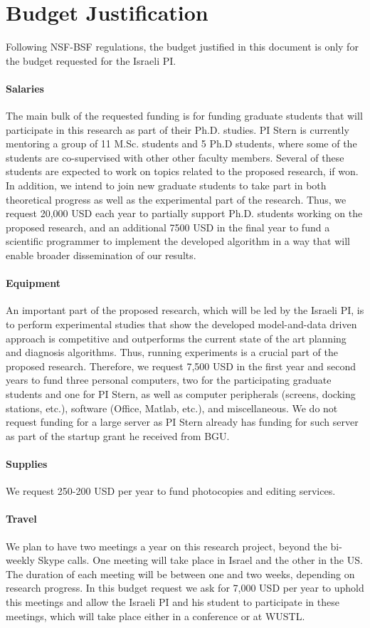 \documentclass[12pt]{article}
\begin{document}
\section*{Budget Justification}
Following NSF-BSF regulations, the budget justified in this document is only for the budget requested for the Israeli PI. 

\paragraph{Salaries}
The main bulk of the requested funding is for funding graduate students that will participate in this research as part of their Ph.D. studies. PI Stern is currently mentoring a group of 11 M.Sc. students and 5 Ph.D students, where some of the students are co-supervised with other other faculty members. Several of these students are expected to work on topics related to the proposed research, if won. In addition, we intend to join new graduate students to take part in both theoretical progress as well as the experimental part of the research. 
Thus, we request 20,000 USD each year to partially support Ph.D. students working on the proposed research, and an additional 7500 USD in the final year to fund a scientific programmer to implement the developed algorithm in a way that will enable broader dissemination of our results. 

\paragraph{Equipment}
An important part of the proposed research, which will be led by the Israeli PI, is to perform experimental studies that show the developed model-and-data driven approach is competitive and outperforms the current state of the art planning and diagnosis algorithms. Thus, running experiments is a crucial part of the proposed research. Therefore, we request 7,500 USD in the first year and second years to fund three personal computers, two for the participating graduate students and one for PI Stern, as well as computer peripherals (screens, docking stations, etc.), software (Office, Matlab, etc.), and miscellaneous. We do not request funding for a large server as PI Stern already has funding for such server as part of the startup grant he received from BGU.

\paragraph{Supplies}
We request 250-200 USD per year to fund photocopies and editing services.

\paragraph{Travel}
We plan to have two meetings a year on this research project, beyond the bi-weekly Skype calls. One meeting will take place in Israel and the other in the US. The duration of each meeting will be between one and two weeks, depending on research progress. In this budget request we ask for 7,000 USD per year to uphold this meetings and allow the Israeli PI and his student to participate in these meetings, which will take place either in a conference or at WUSTL. 
\end{document}

